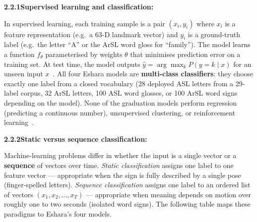 \noindent\textbf{2.2.1\quad Supervised learning and classification:}\par
{}
\vspace{0.3cm}

\noindent In supervised learning, each training sample is a pair $(x_i, y_i)$ where $x_i$ is a feature representation (e.g.\ a 63-D landmark vector) and $y_i$ is a ground-truth label (e.g.\ the letter ``A'' or the ArSL word gloss for ``family''). The model learns a function $f_\theta$ parameterised by weights $\theta$ that minimises prediction error on a training set. At test time, the model outputs $\hat{y} = \arg\max_k P(y{=}k \mid x)$ for an unseen input $x$~\cite{szegedy2016rethinking}. All four Eshara models are \textbf{multi-class classifiers}: they choose exactly one label from a closed vocabulary (28 deployed ASL letters from a 29-label corpus, 32 ArSL letters, 100 ASL word glosses, or 100 ArSL word signs depending on the model). None of the graduation models perform regression (predicting a continuous number), unsupervised clustering, or reinforcement learning~\cite{adaloglou2022comprehensive}.\par\vspace{0.2cm}

\noindent\textbf{2.2.2\quad Static versus sequence classification:}\par
{}
\vspace{0.3cm}

\noindent Machine-learning problems differ in whether the input is a single vector or a \textbf{sequence} of vectors over time. \emph{Static classification} assigns one label to one feature vector --- appropriate when the sign is fully described by a single pose (finger-spelled letters). \emph{Sequence classification} assigns one label to an ordered list of vectors $(x_1, x_2, \ldots, x_T)$ --- appropriate when meaning depends on motion over roughly one to two seconds (isolated word signs). The following table maps these paradigms to Eshara's four models.\par\vspace{0.2cm}

